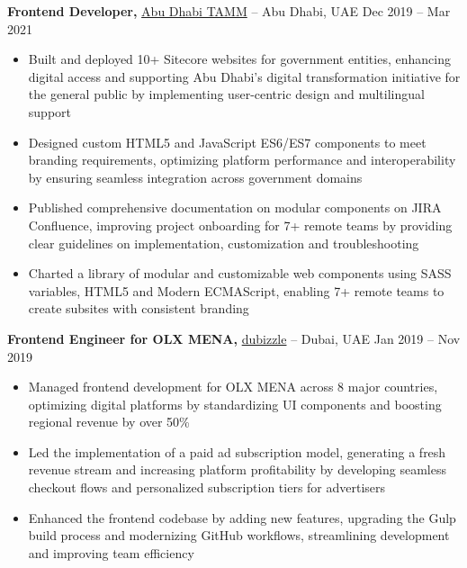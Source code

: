 \documentclass[10pt,letterpaper]{article}
\begin{document}
\textbf{Frontend Developer,} \href{https://www.tamm.abudhabi/}{Abu Dhabi TAMM} -- Abu Dhabi, UAE \hfill Dec 2019 -- Mar 2021 \\
\vspace{-1pt}
\begin{itemize}
  \item Built and deployed 10+ Sitecore websites for government entities, enhancing digital access and supporting Abu Dhabi's digital transformation initiative for the general public by implementing user-centric design and multilingual support
  \item Designed custom HTML5 and JavaScript ES6/ES7 components to meet branding requirements, optimizing platform performance and interoperability by ensuring seamless integration across government domains
  \item Published comprehensive documentation on modular components on JIRA Confluence, improving project onboarding for 7+ remote teams by providing clear guidelines on implementation, customization and troubleshooting
  \item Charted a library of modular and customizable web components using SASS variables, HTML5 and Modern ECMAScript, enabling 7+ remote teams to create subsites with consistent branding
\end{itemize}


\textbf{Frontend Engineer for OLX MENA,} \href{https://www.dubizzle.com/}{dubizzle} -- Dubai, UAE \hfill Jan 2019 -- Nov 2019 \\
\vspace{-1pt}
\begin{itemize}
  \item Managed frontend development for OLX MENA across 8 major countries, optimizing digital platforms by standardizing UI components and boosting regional revenue by over 50\%
  \item Led the implementation of a paid ad subscription model, generating a fresh revenue stream and increasing platform profitability by developing seamless checkout flows and personalized subscription tiers for advertisers
  \item Enhanced the frontend codebase by adding new features, upgrading the Gulp build process and modernizing GitHub workflows, streamlining development and improving team efficiency
\end{itemize}
\end{document}
